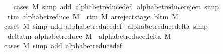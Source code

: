 \begin{isabellebody}
%
\isadelimproof
\ \ %
\endisadelimproof
%
\isatagproof
{}\isamarkupfalse%
\ {\isacharparenleft}{\kern0pt}cases\ M{\isacharparenright}{\kern0pt}\ {\isacharparenleft}{\kern0pt}simp\ add{\isacharcolon}{\kern0pt}\ alphabet{\isacharunderscore}{\kern0pt}reduce{\isacharunderscore}{\kern0pt}def{\isacharparenright}{\kern0pt}%
\endisatagproof
{\isafoldproof}%
%
\isadelimproof
\isanewline
%
\endisadelimproof
\isanewline
{}\isamarkupfalse%
\ alphabet{\isacharunderscore}{\kern0pt}reduce{\isacharunderscore}{\kern0pt}reject\ {\isacharbrackleft}{\kern0pt}simp{\isacharbrackright}{\kern0pt}{\isacharcolon}{\kern0pt}\isanewline
\ \ {\isachardoublequoteopen}r{\isacharunderscore}{\kern0pt}tm\ {\isacharparenleft}{\kern0pt}alphabet{\isacharunderscore}{\kern0pt}reduce\ M{\isacharparenright}{\kern0pt}\ {\isacharequal}{\kern0pt}\ {\isacharparenleft}{\kern0pt}r{\isacharunderscore}{\kern0pt}tm\ M{\isacharcomma}{\kern0pt}\ ar{\isacharunderscore}{\kern0pt}reject{\isacharunderscore}{\kern0pt}stage\ {\isacharparenleft}{\kern0pt}bl{\isacharunderscore}{\kern0pt}tm\ M{\isacharparenright}{\kern0pt}{\isacharparenright}{\kern0pt}{\isachardoublequoteclose}\isanewline
%
\isadelimproof
\ \ %
\endisadelimproof
%
\isatagproof
{}\isamarkupfalse%
\ {\isacharparenleft}{\kern0pt}cases\ M{\isacharparenright}{\kern0pt}\ {\isacharparenleft}{\kern0pt}simp\ add{\isacharcolon}{\kern0pt}\ alphabet{\isacharunderscore}{\kern0pt}reduce{\isacharunderscore}{\kern0pt}def{\isacharparenright}{\kern0pt}%
\endisatagproof
{\isafoldproof}%
%
\isadelimproof
\isanewline
%
\endisadelimproof
\isanewline
{}\isamarkupfalse%
\ alphabet{\isacharunderscore}{\kern0pt}reduce{\isacharunderscore}{\kern0pt}delta\ {\isacharbrackleft}{\kern0pt}simp{\isacharbrackright}{\kern0pt}{\isacharcolon}{\kern0pt}\isanewline
\ \ {\isachardoublequoteopen}delta{\isacharunderscore}{\kern0pt}tm\ {\isacharparenleft}{\kern0pt}alphabet{\isacharunderscore}{\kern0pt}reduce\ M{\isacharparenright}{\kern0pt}\ {\isacharequal}{\kern0pt}\ alphabet{\isacharunderscore}{\kern0pt}reduce{\isacharunderscore}{\kern0pt}delta\ M{\isachardoublequoteclose}\isanewline
%
\isadelimproof
\ \ %
\endisadelimproof
%
\isatagproof
{}\isamarkupfalse%
\ {\isacharparenleft}{\kern0pt}cases\ M{\isacharparenright}{\kern0pt}\ {\isacharparenleft}{\kern0pt}simp\ add{\isacharcolon}{\kern0pt}\ alphabet{\isacharunderscore}{\kern0pt}reduce{\isacharunderscore}{\kern0pt}def{\isacharparenright}{\kern0pt}%
\endisatagproof
{\isafoldproof}%
%
\isadelimproof
\isanewline
%
\endisadelimproof
%
\isadelimtheory
\isanewline
%
\endisadelimtheory
%
\isatagtheory
{}\isamarkupfalse%
%
\endisatagtheory
{\isafoldtheory}%
%
\isadelimtheory
%
\endisadelimtheory
%
\end{isabellebody}%
